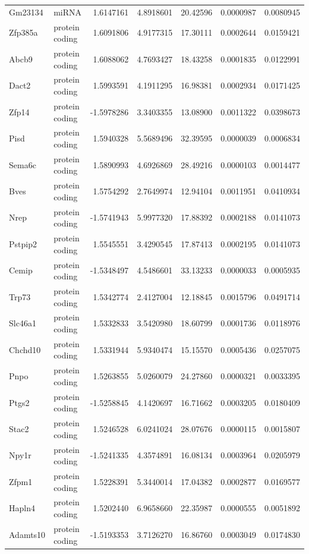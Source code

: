 \documentclass[onehalf,12pt]{beavtex}
\begin{document}
\begin{longtable}{llrrrrr}
  Gm23134 & miRNA & 1.6147161 & 4.8918601 & 20.42596 & 0.0000987 & 0.0080945\\
  Zfp385a & protein coding & 1.6091806 & 4.9177315 & 17.30111 & 0.0002644 & 0.0159421\\
  \addlinespace
  Abcb9 & protein coding & 1.6088062 & 4.7693427 & 18.43258 & 0.0001835 & 0.0122991\\
  Dact2 & protein coding & 1.5993591 & 4.1911295 & 16.98381 & 0.0002934 & 0.0171425\\
  Zfp14 & protein coding & -1.5978286 & 3.3403355 & 13.08900 & 0.0011322 & 0.0398673\\
  Pisd & protein coding & 1.5940328 & 5.5689496 & 32.39595 & 0.0000039 & 0.0006834\\
  Sema6c & protein coding & 1.5890993 & 4.6926869 & 28.49216 & 0.0000103 & 0.0014477\\
  \addlinespace
  Bves & protein coding & 1.5754292 & 2.7649974 & 12.94104 & 0.0011951 & 0.0410934\\
  Nrep & protein coding & -1.5741943 & 5.9977320 & 17.88392 & 0.0002188 & 0.0141073\\
  Pstpip2 & protein coding & 1.5545551 & 3.4290545 & 17.87413 & 0.0002195 & 0.0141073\\
  Cemip & protein coding & -1.5348497 & 4.5486601 & 33.13233 & 0.0000033 & 0.0005935\\
  Trp73 & protein coding & 1.5342774 & 2.4127004 & 12.18845 & 0.0015796 & 0.0491714\\
  \addlinespace
  Slc46a1 & protein coding & 1.5332833 & 3.5420980 & 18.60799 & 0.0001736 & 0.0118976\\
  Chchd10 & protein coding & 1.5331944 & 5.9340474 & 15.15570 & 0.0005436 & 0.0257075\\
  Pnpo & protein coding & 1.5263855 & 5.0260079 & 24.27860 & 0.0000321 & 0.0033395\\
  Ptgs2 & protein coding & -1.5258845 & 4.1420697 & 16.71662 & 0.0003205 & 0.0180409\\
  Stac2 & protein coding & 1.5246528 & 6.0241024 & 28.07676 & 0.0000115 & 0.0015807\\
  \addlinespace
  Npy1r & protein coding & -1.5241335 & 4.3574891 & 16.08134 & 0.0003964 & 0.0205979\\
  Zfpm1 & protein coding & 1.5228391 & 5.3440014 & 17.04382 & 0.0002877 & 0.0169577\\
  Hapln4 & protein coding & 1.5202440 & 6.9658660 & 22.35987 & 0.0000555 & 0.0051892\\
  Adamts10 & protein coding & -1.5193353 & 3.7126270 & 16.86760 & 0.0003049 & 0.0174830\\

\end{longtable}
\end{document}
